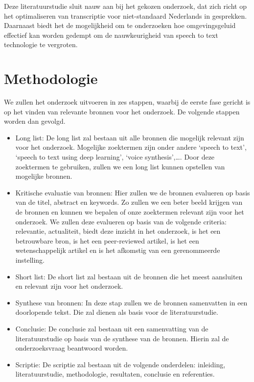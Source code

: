 Deze literatuurstudie sluit nauw aan bij het gekozen onderzoek, dat zich richt op het optimaliseren van transcriptie voor niet-standaard Nederlands in gesprekken. Daarnaast biedt het de mogelijkheid om te onderzoeken hoe omgevingsgeluid effectief kan worden gedempt om de nauwkeurigheid van speech to text technologie te vergroten.


\section{Methodologie}%
\label{sec:methodologie}

We zullen het onderzoek uitvoeren in zes stappen, waarbij de eerste fase gericht is op het vinden van relevante bronnen voor het onderzoek. De volgende stappen worden dan gevolgd.

\begin{itemize}
    \item Long list: De long list zal bestaan uit alle bronnen die mogelijk relevant zijn voor het onderzoek. Mogelijke zoektermen zijn onder andere `speech to text', `speech to text using deep learning', `voice synthesis',\dots. Door deze zoektermen te gebruiken, zullen we een long list kunnen opstellen van mogelijke bronnen.
    \item Kritische evaluatie van bronnen: Hier zullen we de bronnen evalueren op basis van de titel, abstract en keywords. Zo zullen we een beter beeld krijgen van de bronnen en kunnen we bepalen of onze zoektermen relevant zijn voor het onderzoek. We zullen deze evalueren op basis van de volgende criteria: relevantie, actualiteit, biedt deze inzicht in het onderzoek, is het een betrouwbare bron, is het een peer-reviewed artikel, is het een wetenschappelijk artikel en is het afkomstig van een gerenommeerde instelling.
    \item Short list: De short list zal bestaan uit de bronnen die het meest aansluiten en relevant zijn voor het onderzoek.
    \item Synthese van bronnen: In deze stap zullen we de bronnen samenvatten in een doorlopende tekst. Die zal dienen als basis voor de literatuurstudie.
    \item Conclusie: De conclusie zal bestaan uit een samenvatting van de literatuurstudie op basis van de synthese van de bronnen. Hierin zal de onderzoeksvraag beantwoord worden.
    \item Scriptie: De scriptie zal bestaan uit de volgende onderdelen: inleiding, literatuurstudie, methodologie, resultaten, conclusie en referenties.
\end{itemize}

